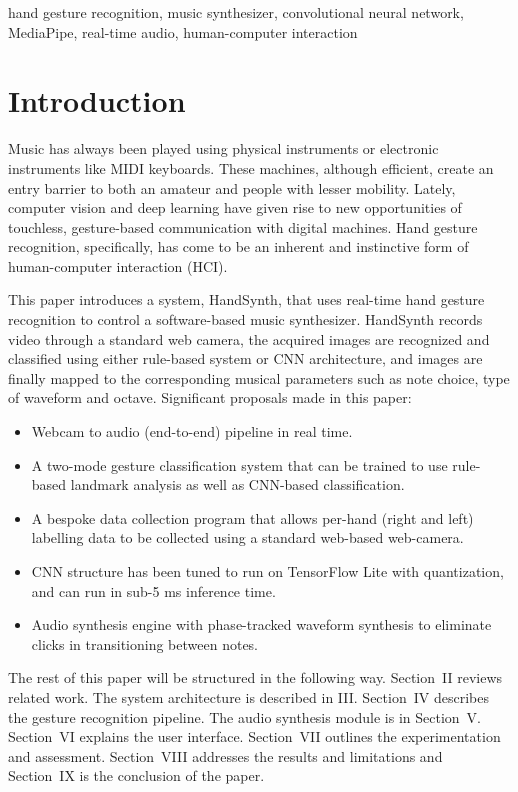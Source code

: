 \documentclass[conference]{IEEEtran}
\begin{document}
\begin{IEEEkeywords}
hand gesture recognition, music synthesizer, convolutional neural network, MediaPipe, real-time audio, human-computer interaction
\end{IEEEkeywords}

\section{Introduction}

Music has always been played using physical instruments or electronic instruments like MIDI keyboards. These machines, although efficient, create an entry barrier to both an amateur and people with lesser mobility. Lately, computer vision and deep learning have given rise to new opportunities of touchless, gesture-based communication with digital machines. Hand gesture recognition, specifically, has come to be an inherent and instinctive form of human-computer interaction (HCI).

This paper introduces a system, HandSynth, that uses real-time hand gesture recognition to control a software-based music synthesizer. HandSynth records video through a standard web camera, the acquired images are recognized and classified using either rule-based system or CNN architecture, and images are finally mapped to the corresponding musical parameters such as note choice, type of waveform and octave. Significant proposals made in this paper:

\begin{itemize}
\item Webcam to audio (end-to-end) pipeline in real time.
\item A two-mode gesture classification system that can be trained to use rule-based landmark analysis as well as CNN-based classification.
\item A bespoke data collection program that allows per-hand (right and left) labelling data to be collected using a standard web-based web-camera.
\item CNN structure has been tuned to run on TensorFlow Lite with quantization, and can run in sub-5 ms inference time.
\item Audio synthesis engine with phase-tracked waveform synthesis to eliminate clicks in transitioning between notes.
\end{itemize}

The rest of this paper will be structured in the following way. Section~II reviews related work. The system architecture is described in III. Section~IV describes the gesture recognition pipeline. The audio synthesis module is in Section~V. Section~VI explains the user interface. Section~VII outlines the experimentation and assessment. Section~VIII addresses the results and limitations and Section~IX is the conclusion of the paper.
\end{document}
